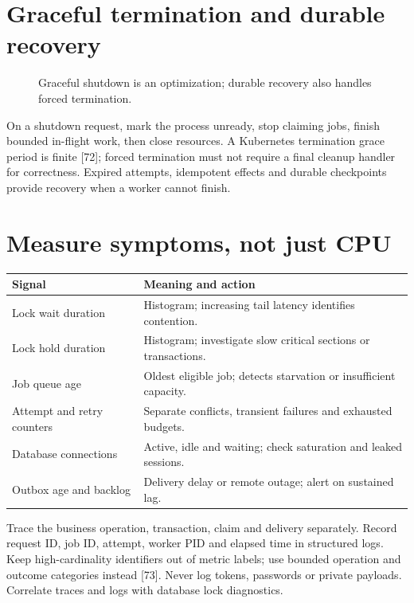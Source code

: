 \section{Graceful termination and durable recovery}
\begin{figure}[!htbp]\centering
{}
\caption{Graceful shutdown is an optimization; durable recovery also handles forced termination.}
\end{figure}
On a shutdown request, mark the process unready, stop claiming jobs,
finish bounded in-flight work, then close resources. A Kubernetes
termination grace period is finite [72]; forced termination must not
require a final cleanup handler for correctness. Expired attempts,
idempotent effects and durable checkpoints provide recovery when a
worker cannot finish.

\section{Measure symptoms, not just CPU}
\begin{longtable}{L{.33\linewidth}L{.59\linewidth}}
\toprule Signal & Meaning and action \\ \midrule\endhead
Lock wait duration & Histogram; increasing tail latency identifies contention. \\
Lock hold duration & Histogram; investigate slow critical sections or transactions. \\
Job queue age & Oldest eligible job; detects starvation or insufficient capacity. \\
Attempt and retry counters & Separate conflicts, transient failures and exhausted budgets. \\
Database connections & Active, idle and waiting; check saturation and leaked sessions. \\
Outbox age and backlog & Delivery delay or remote outage; alert on sustained lag. \\
\bottomrule
\end{longtable}
Trace the business operation, transaction, claim and delivery separately.
Record request ID, job ID, attempt, worker PID and elapsed time in structured
logs. Keep high-cardinality identifiers out of metric labels; use bounded
operation and outcome categories instead [73]. Never log tokens, passwords
or private payloads. Correlate traces and logs with database lock diagnostics.

